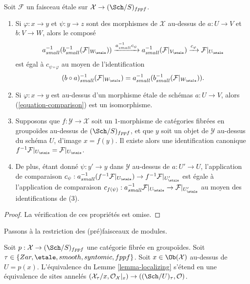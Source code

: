 \begin{lemma}
\label{lemma-comparison}
Soit $\mathcal{F}$ un faisceau étale sur $\mathcal{X} \to (\Sch/S)_{fppf}$.
\begin{enumerate}
\item Si $\varphi : x \to y$ et $\psi : y \to z$
sont des morphismes de $\mathcal{X}$ au-dessus de $a : U \to V$ et
$b : V \to W$, alors le composé
$$
a_{small}^{-1}(b_{small}^{-1} (\mathcal{F}|_{W_\etale}))
\xrightarrow{a_{small}^{-1}c_\psi}
a_{small}^{-1}(\mathcal{F}|_{V_\etale})
\xrightarrow{c_\varphi}
\mathcal{F}|_{U_\etale}
$$
est égal à $c_{\psi \circ \varphi}$ au moyen de l'identification
$$
(b \circ a)_{small}^{-1}(\mathcal{F}|_{W_\etale}) =
a_{small}^{-1}(b_{small}^{-1} (\mathcal{F}|_{W_\etale})).
$$
\item Si $\varphi : x \to y$ est au-dessus d'un morphisme étale de schémas
$a : U \to V$, alors (\ref{equation-comparison}) est un isomorphisme.
\item Supposons que $f : \mathcal{Y} \to \mathcal{X}$ soit un $1$-morphisme de
catégories fibrées en groupoïdes au-dessus de $(\Sch/S)_{fppf}$, et que $y$ soit
un objet de $\mathcal{Y}$ au-dessus du schéma $U$, d'image
$x = f(y)$. Il existe alors une identification canonique
$f^{-1}\mathcal{F}|_{U_\etale} = \mathcal{F}|_{U_\etale}$.
\item De plus, étant donné $\psi : y' \to y$ dans $\mathcal{Y}$ au-dessus de
$a : U' \to U$, l'application de comparaison
$c_\psi : a_{small}^{-1}(f^{-1}\mathcal{F}|_{U_\etale}) \to
f^{-1}\mathcal{F}|_{U'_\etale}$ est égale à
l'application de comparaison $c_{f(\psi)} : a_{small}^{-1}\mathcal{F}|_{U_\etale}
\to \mathcal{F}|_{U'_\etale}$ au moyen des identifications de (3).
\end{enumerate}
\end{lemma}

\begin{proof}
La vérification de ces propriétés est omise.
\end{proof}

\noindent
Passons à la restriction des (pré)faisceaux de modules.

\begin{lemma}
\label{lemma-localizing-structure-sheaf}
Soit $p : \mathcal{X} \to (\Sch/S)_{fppf}$ une catégorie fibrée
en groupoïdes. Soit $\tau \in \{Zar, \etale, smooth, syntomic, fppf\}$.
Soit $x \in \Ob(\mathcal{X})$ au-dessus de $U = p(x)$.
L'équivalence du
Lemme \ref{lemma-localizing}
s'étend en une équivalence de sites annelés
$(\mathcal{X}_\tau/x, \mathcal{O}_\mathcal{X}|_x) \to
((\Sch/U)_\tau, \mathcal{O})$.
\end{lemma}

